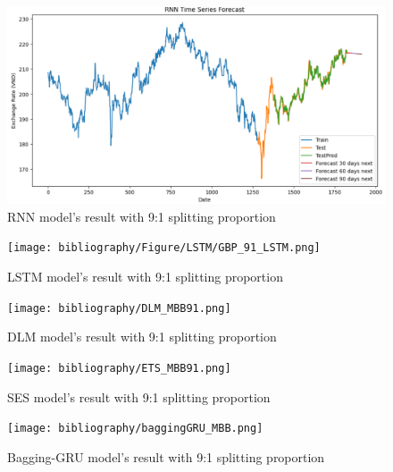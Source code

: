 \documentclass{ieeeojies}
\begin{document}
\begin{figure}[H]
  \centering
  \begin{minipage}{0.8\linewidth}
    \centering
    \includegraphics[width=\linewidth]{RNN_GBP.png}
    \caption{RNN model's result with 9:1 splitting proportion}
    \label{fig19}
  \end{minipage}
\end{figure}
\begin{figure}[H]
  \centering
  \begin{minipage}{0.8\linewidth}
    \centering
    \texttt{[image: bibliography/Figure/LSTM/GBP\_91\_LSTM.png]}
    \caption{LSTM model's result with 9:1 splitting proportion}
    \label{fig8}
  \end{minipage}
\end{figure}
\begin{figure}[H]
  \centering
  \begin{minipage}{0.8\linewidth}
    \centering
    \texttt{[image: bibliography/DLM\_MBB91.png]}
    \caption{DLM model's result with 9:1 splitting proportion}
    \label{fig20}
  \end{minipage}
\end{figure}
\begin{figure}[H]
  \centering
  \begin{minipage}{0.8\linewidth}
    \centering
    \texttt{[image: bibliography/ETS\_MBB91.png]}
    \caption{SES model's result with 9:1 splitting proportion}
    \label{fig21}
  \end{minipage}
\end{figure}
\begin{figure}[H]
  \centering
  \begin{minipage}{0.8\linewidth}
    \centering
    \texttt{[image: bibliography/baggingGRU\_MBB.png]}
    \caption{Bagging-GRU model's result with 9:1 splitting proportion}
    \label{mbbbggg}
  \end{minipage}
\end{figure}
\end{document}
